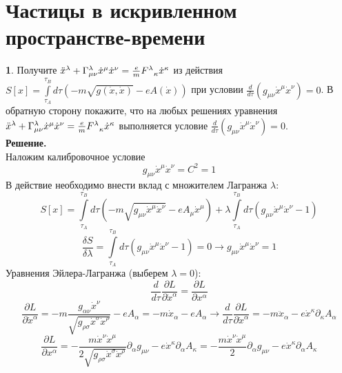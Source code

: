 \documentclass[12pt]{article}
\theoremstyle{definition}
\newtheorem{zad}{}[section]
\begin{document}
\section{Частицы в искривленном пространстве-времени}
\begin{zad}
Получите $\Ddot{x}^\lambda+\Gamma^\lambda_{\mu\nu}\dot{x}^\mu\dot{x}^\nu=\frac{e}{m}F^\lambda_{\;\;\;\kappa}\dot{x}^\kappa$ из действия $S[x]=\int\limits_{\tau_A}^{\tau_B}d\tau(-m\sqrt{g(\dot{x},\dot{x})}-eA(\dot{x}))$ при условии $\frac{d}{d\tau}(g_{\mu\nu}\dot{x}^\mu\dot{x}^\nu)=0$. В обратную сторону покажите, что на любых решениях уравнения $\Ddot{x}^\lambda+\Gamma^\lambda_{\mu\nu}\dot{x}^\mu\dot{x}^\nu=\frac{e}{m}F^\lambda_{\;\;\;\kappa}\dot{x}^\kappa$ выполняется условие $\frac{d}{d\tau}(g_{\mu\nu}\dot{x}^\mu\dot{x}^\nu)=0$.\\
\textbf{Решение.}\\
Наложим калибровочное условие
\begin{equation}
g_{\mu\nu}\dot{x}^\mu\dot{x}^\nu=C^2=1
\end{equation}
В действие необходимо внести вклад с множителем Лагранжа $\lambda$:
\begin{equation}
S[x]=\int\limits_{\tau_A}^{\tau_B}d\tau(-m\sqrt{g_{\mu\nu}\dot{x}^\mu\dot{x}^\nu}-eA_\mu \dot{x}^\mu)+\lambda\int\limits_{\tau_A}^{\tau_B}d\tau(g_{\mu\nu}\dot{x}^\mu\dot{x}^\nu-1)
\end{equation}
\begin{equation}
\dfrac{\delta S}{\delta\lambda}=\int\limits_{\tau_A}^{\tau_B}d\tau(g_{\mu\nu}\dot{x}^\mu\dot{x}^\nu-1)=0\rightarrow g_{\mu\nu}\dot{x}^\mu\dot{x}^\nu=1
\end{equation}
Уравнения Эйлера-Лагранжа (выберем $\lambda=0$):
\begin{equation}
\frac{d}{d\tau}\frac{\partial L}{\partial\dot{x}^\alpha}=\frac{\partial L}{\partial x^\alpha}
\end{equation}
\begin{equation}
    \frac{\partial L}{\partial\dot{x}^\alpha}=-m\frac{g_{\alpha\nu}\dot{x}^\nu}{\sqrt{g_{\rho\sigma}\dot{x}^\sigma\dot{x}^\rho}}-eA_\alpha=-m\dot{x}_\alpha-eA_\alpha\rightarrow \frac{d}{d\tau}\frac{\partial L}{\partial\dot{x}^\alpha}=-m\ddot{x}_\alpha-e\dot{x}^\kappa\partial_\kappa A_\alpha
\end{equation}
\begin{equation}
    \frac{\partial L}{\partial x^\alpha}=-\frac{m\dot{x}^\nu\dot{x}^\mu}{2\sqrt{g_{\rho\sigma}\dot{x}^\sigma\dot{x}^\rho}}\partial_\alpha g_{\mu\nu}-e\dot{x}^\kappa \partial_\alpha A_\kappa=-\frac{m\dot{x}^\nu\dot{x}^\mu}{2}\partial_\alpha g_{\mu\nu}-e\dot{x}^\kappa \partial_\alpha A_\kappa

\end{equation}
\end{zad}
\end{document}
